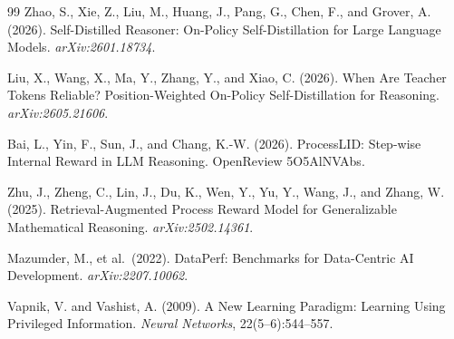 \documentclass[11pt]{article}
\begin{document}
\begin{thebibliography}{99}
 Zhao, S., Xie, Z., Liu, M., Huang, J., Pang, G.,
Chen, F., and Grover, A. (2026). Self-Distilled Reasoner: On-Policy
Self-Distillation for Large Language Models. \emph{arXiv:2601.18734}.

 Liu, X., Wang, X., Ma, Y., Zhang, Y., and Xiao, C.
(2026). When Are Teacher Tokens Reliable? Position-Weighted On-Policy
Self-Distillation for Reasoning. \emph{arXiv:2605.21606}.

 Bai, L., Yin, F., Sun, J., and Chang, K.-W.
(2026). ProcessLID: Step-wise Internal Reward in LLM Reasoning.
OpenReview 5O5AlNVAbs.

 Zhu, J., Zheng, C., Lin, J., Du, K., Wen, Y.,
Yu, Y., Wang, J., and Zhang, W. (2025). Retrieval-Augmented Process Reward
Model for Generalizable Mathematical Reasoning. \emph{arXiv:2502.14361}.

 Mazumder, M., et al.\ (2022). DataPerf:
Benchmarks for Data-Centric AI Development. \emph{arXiv:2207.10062}.

 Vapnik, V. and Vashist, A. (2009). A New
Learning Paradigm: Learning Using Privileged Information. \emph{Neural
Networks}, 22(5--6):544--557.

\end{thebibliography}
\end{document}

